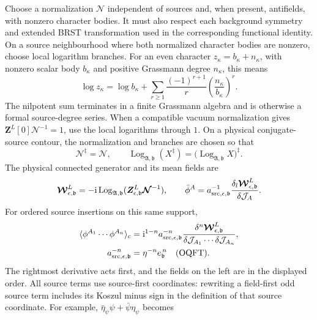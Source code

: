 \documentclass[final,5p,times,twocolumn,numbers,nopreprintline]{elsarticle}
\numberwithin{equation}{section}
\theoremstyle{definition}
\theoremstyle{remark}
\newcommand{\ii}{\mathrm i}
\newcommand{\bb}{\mathfrak b}
\newcommand{\vct}[1]{\boldsymbol{#1}}
\newcommand{\ee}{e_{\bb}}
\begin{document}
Choose a normalization \(\vct{\mathcal N}\) independent of
sources and, when present, antifields, with nonzero character bodies.
It must also respect each background symmetry and extended BRST
transformation used in the corresponding functional identity.
On a source neighbourhood where both normalized character bodies
are nonzero, choose local logarithm branches. For an even character
\(z_\kappa=b_\kappa+n_\kappa\), with nonzero scalar body
\(b_\kappa\) and positive Grassmann degree \(n_\kappa\), this means
\[
 \log z_\kappa=\log b_\kappa+
  \sum_{r\geq1}\frac{(-1)^{r+1}}{r}
       \left(\frac{n_\kappa}{b_\kappa}\right)^r .
\]
The nilpotent sum terminates in a finite Grassmann algebra and is
otherwise a formal source-degree series. When a compatible vacuum
normalization gives \(\vct Z^L[0]\vct{\mathcal N}^{-1}=1\), use
the local logarithms through \(1\). On a physical conjugate-source
contour, the normalization and branches are chosen so that
\[
 \vct{\mathcal N}^{\ddagger}=\vct{\mathcal N},\qquad
 \operatorname{Log}_{\mathfrak A,\bb}(X^\ddagger)
  =\bigl(\operatorname{Log}_{\mathfrak A,\bb}X\bigr)^\ddagger .
\]
The physical connected generator and its mean fields are
\begin{equation}
 \vct{\mathcal W}^L_{\epsilon,\bb}
   =-\ii\operatorname{Log}_{\mathfrak A,\bb}
       (\vct Z^L_{\epsilon,\bb}\vct{\mathcal N}^{-1}),
 \qquad
 \bar\phi^A
  =a_{{\rm src},\epsilon,\bb}^{-1}
       \frac{\delta_l\vct{\mathcal W}^L_{\epsilon,\bb}}
            {\delta\mathcal J_A}.
 \label{eq:physical-connected-source-rule}
\end{equation}
For ordered source insertions on this same support,
\begin{equation}
\begin{aligned}
 \langle\phi^{A_1}\cdots\phi^{A_n}\rangle_c
  &=\ii^{1-n}a_{{\rm src},\epsilon,\bb}^{-n}
    \frac{\delta^n\vct{\mathcal W}^L_{\epsilon,\bb}}
     {\delta\mathcal J_{A_1}\cdots\delta\mathcal J_{A_n}},\\
 a_{{\rm src},\epsilon,\bb}^{-n}
   &=\eta^{-n}\ee^{\,n}\quad({\rm OQFT}).
\end{aligned}
 \label{eq:physical-source-derivative-parity}
\end{equation}
The rightmost derivative acts first, and the fields on the left
are in the displayed order. All source terms use source-first
coordinates: rewriting a field-first odd source term includes its
Koszul minus sign in the definition of that source coordinate.
For example, \(\bar\eta_\psi\psi+\bar\psi\eta_\psi\) becomes
\end{document}
